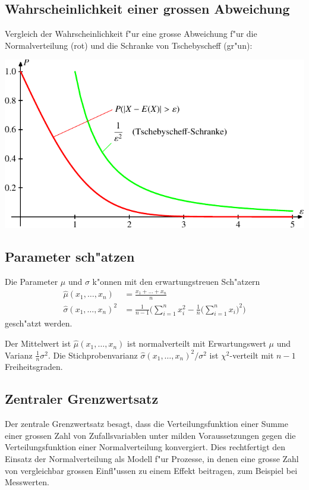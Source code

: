 \subsection{Wahrscheinlichkeit einer grossen Abweichung}
Vergleich der Wahrscheinlichkeit f"ur eine grosse Abweichung
f"ur die Normalverteilung (rot) und die Schranke von Tschebyscheff (gr"un):
\begin{center}
\includegraphics{images/norm-1.pdf}
\end{center}

\subsection{Parameter sch"atzen}
Die Parameter $\mu$ und $\sigma$ k"onnen mit den erwartungstreuen Sch"atzern
\begin{align*}
\hat\mu(x_1,\dots,x_n)&=\frac{x_1+\dots+x_n}{n}\\
\hat\sigma(x_1,\dots,x_n)^2&=\frac{1}{n-1}\biggl(
\sum_{i=1}^n x_i^2 - \frac1n\biggl(\sum_{i=1}^n x_i\biggr)^2
\biggr)
\end{align*}
gesch"atzt werden.

Der Mittelwert ist $\hat\mu(x_1,\dots,x_n)$ ist normalverteilt mit Erwartungswert
$\mu$ und Varianz $\frac1n\sigma^2$.
Die Stichprobenvarianz $\hat\sigma(x_1,\dots,x_n)^2/\sigma^2$ ist $\chi^2$-verteilt
mit $n-1$ Freiheitsgraden.

\subsection{Zentraler Grenzwertsatz}
Der zentrale Grenzwertsatz besagt, dass die Verteilungsfunktion einer Summe
einer grossen Zahl von Zufallsvariablen unter milden Voraussetzungen
gegen die Verteilungsfunktion einer Normalverteilung konvergiert.
Dies rechtfertigt den Einsatz der Normalverteilung als Modell f"ur Prozesse,
in denen eine grosse Zahl von vergleichbar grossen Einfl"ussen zu einem Effekt
beitragen, zum Beispiel bei Messwerten.

